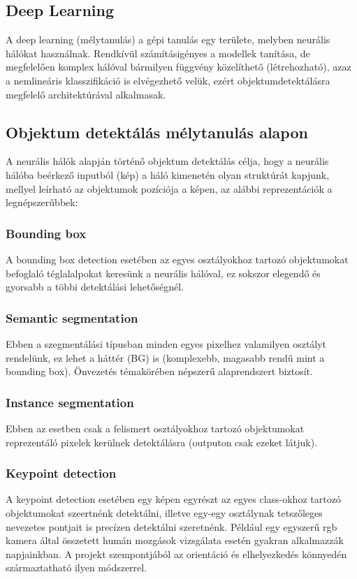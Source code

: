 \documentclass{article}
\begin{document}
\subsection{Deep Learning}
A deep learning (mélytanulás) a gépi tanulás egy területe, melyben 
neurális hálókat használnak. Rendkívül számításigényes a modellek tanítása, 
de megfelelően komplex hálóval bármilyen függvény közelíthető (létrehozható), 
azaz a nemlineáris klasszifikáció is elvégezhető velük, ezért objektumdetektálásra 
megfelelő architektúrával alkalmasak.
\subsection{Objektum detektálás mélytanulás alapon}
A neurális hálók alapján történő objektum detektálás célja, hogy a neurális 
hálóba beérkező inputból (kép) a háló kimenetén olyan struktúrát kapjunk, mellyel 
leírható az objektumok pozíciója a képen, az alábbi reprezentációk a legnépszerűbbek:
\subsubsection{Bounding box}
A bounding box detection esetében az egyes osztályokhoz tartozó objektumokat 
befoglaló téglalalpokat keresünk a neurális hálóval, ez sokszor elegendő és 
gyorsabb a többi detektálási lehetőségnél.
\subsubsection{Semantic segmentation}
Ebben a szegmentálási típusban minden egyes pixelhez valamilyen osztályt rendelünk, 
ez lehet a háttér (BG) is (komplexebb, magasabb rendű mint a bounding box). Önvezetés témakörében népszerű alaprendszert biztosít.
\subsubsection{Instance segmentation}
Ebben az esetben csak a felismert osztályokhoz tartozó objektumokat reprezentáló 
pixelek kerülnek detektálásra (outputon csak ezeket látjuk).
\subsubsection{Keypoint detection}
A keypoint detection esetében egy képen egyrészt az egyes class-okhoz
tartozó objektumokat szeertnénk detektálni, illetve egy-egy osztálynak
tetszőleges nevezetes pontjait is precízen detektálni szeretnénk. Például 
egy egyszerű rgb kamera által összetett humán mozgások vizsgálata esetén 
gyakran alkalmazzák napjainkban. A projekt szempontjából az orientáció 
és elhelyezkedés könnyedén származtatható ilyen módszerrel.
\end{document}
